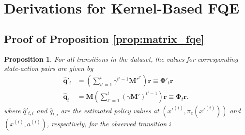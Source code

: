 \documentclass{article}
\newtheorem{proposition}{Proposition}
\begin{document}

\section{Derivations for Kernel-Based FQE}
\label{appendix:fqe}

\subsection{Proof of Proposition \ref{prop:matrix_fqe}}
\label{appendix:proof_matrix_fqe}

\begin{proposition}
\label{prop:matrix_fqe_restated}
For all transitions in the dataset, the values for corresponding state-action pairs are given by
\begin{align}
    \mathbf{\hat{q}}'_t &= \left( \sum_{t'=1}^t \gamma^{t'-1} \mathbf{M}'^{t'} \right) \mathbf{r} \equiv \mathbf{\Phi}'_t \mathbf{r} \label{eq:q_prime_estimate} \\
    \mathbf{\hat{q}}_t &= \mathbf{M} \left( \sum_{t'=1}^t \left( \gamma \mathbf{M}' \right)^{t'-1} \right) \mathbf{r} \equiv \mathbf{\Phi}_t \mathbf{r}.
\end{align}
where $\hat{q}'_{t, i}$ and $\hat{q}_{t, i}$ are the estimated policy values at $(x'^{(i)}, \pi_e(x'^{(i)}))$ and $(x^{(i)}, a^{(i)})$, respectively, for the observed transition $i$
\end{proposition}
\end{document}
